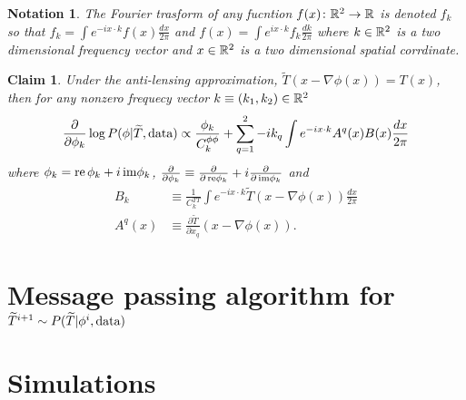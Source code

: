 \documentclass[noinfoline]{imsart}
\newtheorem{claim}{Claim}
\newtheorem{notation}{Notation}
\begin{document}
\begin{notation}
The Fourier trasform of any fucntion $f(x)\colon\Bbb R^2 \rightarrow \Bbb R$ is denoted $f_k$ so that
$f_k  =  \int e^{-i x\cdot k}  f(x)\frac{dx}{2\pi}$ and
$f(x) =  \int e^{i x\cdot k}  f_k \frac{dk}{2\pi}$ 
where $k\in \Bbb R^2$ is a two dimensional frequency vector and $x\in \Bbb R^2$  is a two dimensional spatial corrdinate.
\end{notation}





\begin{claim} Under the anti-lensing approximation,  $\widetilde T(x-\nabla\phi(x)) = T(x)$,  then for any nonzero frequecy vector $k\equiv (k_1, k_2) \in \Bbb R^2$ 
 \[\frac{\partial}{\partial \phi_k}\log P(\phi | \widetilde T,  \text{\rm data}) \propto \frac{\phi_k}{C^{\phi\phi}_{k}} + \sum_{q=1}^2 - {i k_q} \int e^{-i x\cdot k} A^q(x)B(x) \frac{dx}{2\pi}   \]
 where  $\phi_k = \text{\rm re} \,\phi_k + i\, \text{\rm im}\phi_k$, $\frac{\partial}{\partial \phi_k}\equiv \frac{\partial}{\partial\, \text{\rm re} \phi_k} + i \frac{\partial}{\partial\, \text{\rm im}\phi_k}$ and 
 \begin{align}
 B_k &\equiv \frac{1}{C_k^{TT}} \int e^{-i x\cdot k}  \widetilde T(x-\nabla \phi(x))\frac{dx}{2\pi} \\ 
 A^q(x) &\equiv \frac{\partial\widetilde T}{\partial x_q}(x-\nabla \phi(x)).
 \end{align}
\end{claim}



\section{Message passing algorithm for $\widetilde T^{i+1}\sim P(\widetilde T |  \phi^{i},\text{\rm data})$}


\section{Simulations}
\end{document}
